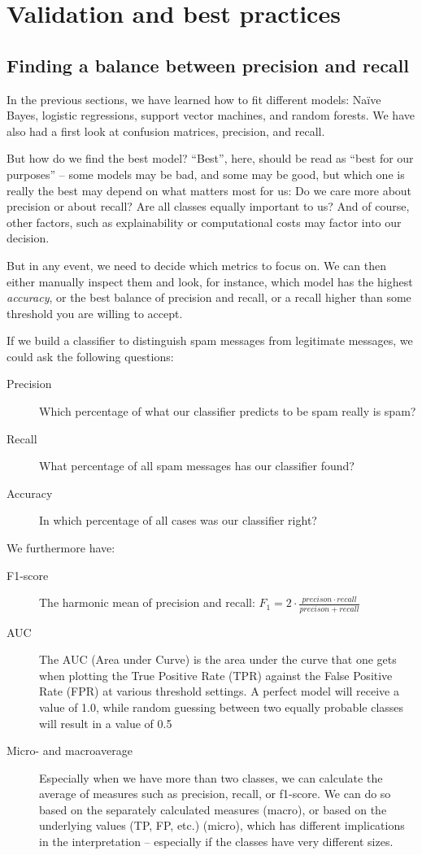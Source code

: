 \section{Validation and best practices}
\label{sec:validation}
\subsection{Finding a balance between precision and recall}
\label{sec:balance}

In the previous sections, we have learned how to fit different models:
Na\"ive Bayes, logistic regressions, support vector machines, and
random forests.  We have also had a first look at confusion matrices,
precision, and recall.

But how do we find the best model? ``Best'', here, should be read as
``best for our purposes'' -- some models may be bad, and some may be
good, but which one is really the best may depend on what matters most
for us: Do we care more about precision or about recall? Are all
classes equally important to us?  And of course, other factors, such
as explainability or computational costs may factor into our decision.
 
But in any event, we need to decide which metrics to focus on.  We can
then either manually inspect them and look, for instance, which model
has the highest \emph{accuracy}, or the best balance of precision and recall,
or a recall higher than some threshold you are willing to accept.

If we build a classifier to distinguish spam messages from legitimate
messages, we could ask the following questions:
\begin{description}
\item[Precision] Which percentage of what our classifier predicts to be
  spam really is spam?
\item[Recall]{What percentage of all spam messages has our classifier
  found?}
\item[Accuracy]{In which percentage of all cases was our classifier
  right?}
\end{description}

We furthermore have:
\begin{description}
\item[F1-score]{The harmonic mean of precision and recall: $F_1 = 2
  \cdot \frac{precison \cdot recall}{precison + recall}$}
\item[AUC]{The AUC (Area under Curve) is the area under the curve that
  one gets when plotting the True Positive Rate (TPR) against the
  False Positive Rate (FPR) at various threshold settings. A perfect
  model will receive a value of 1.0, while random guessing between two
  equally probable classes will result in a value of 0.5}
\item[Micro- and macroaverage]{Especially when we have more than two
  classes, we can calculate the average of measures such as precision,
  recall, or f1-score. We can do so based on the separately calculated
  measures (macro), or based on the underlying values (TP, FP, etc.)
  (micro), which has different implications in the interpretation --
  especially if the classes have very different sizes.}
\end{description}


